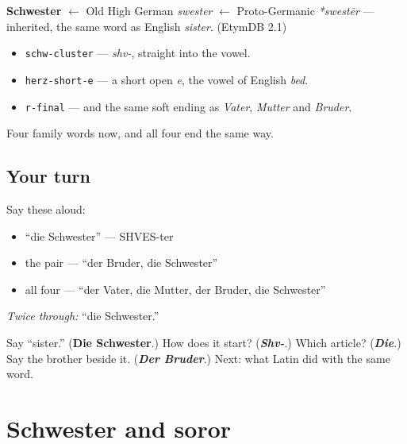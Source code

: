\begin{cousinweb}
\textbf{Schwester} $\leftarrow$ Old High German \emph{swester} $\leftarrow$ Proto-Germanic \emph{*swestēr} — inherited, the same word as English \emph{sister}. (EtymDB 2.1)
\end{cousinweb}

\begin{sounds}
\begin{itemize}
\raggedright
  \item \texttt{schw-cluster} — \emph{shv-}, straight into the vowel.
  \item \texttt{herz-short-e} — a short open \emph{e}, the vowel of English \emph{bed}.
  \item \texttt{r-final} — and the same soft ending as \emph{Vater}, \emph{Mutter} and \emph{Bruder}.
\end{itemize}

Four family words now, and all four end the same way.
\end{sounds}

\subsection*{Your turn}
Say these aloud:

\begin{itemize}
\raggedright
  \item \textquotedblleft{}die Schwester\textquotedblright{} — SHVES-ter
  \item the pair — \textquotedblleft{}der Bruder, die Schwester\textquotedblright{}
  \item all four — \textquotedblleft{}der Vater, die Mutter, der Bruder, die Schwester\textquotedblright{}
\end{itemize}

\emph{Twice through:} \textquotedblleft{}die Schwester.\textquotedblright{}

\begin{tcolorbox}[breakable,colback=teal!4,colframe=teal!35!black,title={Before you move on}]
Say \textquotedblleft{}sister.\textquotedblright{} (\textbf{Die Schwester}.) How does it start? (\emph{\textbf{Shv-}}.) Which article? (\emph{\textbf{Die}}.) Say the brother beside it. (\emph{\textbf{Der Bruder}}.) Next: what Latin did with the same word.
\end{tcolorbox}
\section[Schwester und soror]{Schwester and soror}

